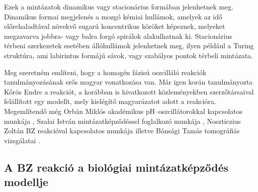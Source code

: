 Ezek a mintázatok dinamikus vagy stacionárius formában jelenhetnek meg.
Dinamikus formai megjelenés a mozgó kémiai hullámok, amelyek az idő előrehaladtával növekvő sugarú koncentrikus köröket képeznek, melyeket megzavarva jobbra- vagy balra forgó spirálok alakulhatnak ki.
Stacionárius térbeni szerkezetek esetében állóhullámok jelenhetnek meg, ilyen például a Turing struktúra, ami labirintus formájú sávok, vagy szabályos pontok térbeli mintázata.

Meg szeretném említeni, hogy a homogén fázisú oszcilláló reakciók tanulmányozásának erős magyar vonatkozása van. Már igen korán tanulmányozta Kőrös Endre a reakciót, a korábban is hivatkozott közleményekben \cite{field1974oscillations, noyes1972oscillations} szerzőtársaival felállított egy modellt, mely kielégítő magyarázatot adott a reakcióra. Megemlítendő még Orbán Miklós akadémikus pH--oszcillátorokkal kapcsolatos munkája \cite{orban2015ph}, Szalai István mintázatképződéssel foglalkozó munkája \cite{molnar2015pattern}, Noszticzius Zoltán BZ reakcióval kapcsolatos munkája \cite{noszticzius1987sustained} illetve Bánsági Tamás tomográfiás vizsgálatai \cite{bansagi2011tomography}.


\subsection{A BZ reakció a biológiai mintázatképződés modellje}

